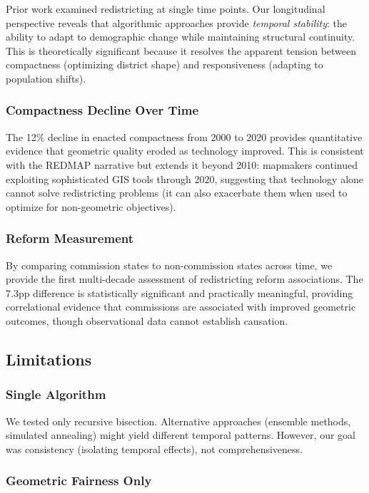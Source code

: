 Prior work examined redistricting at single time points. Our longitudinal perspective reveals that algorithmic approaches provide \textit{temporal stability}: the ability to adapt to demographic change while maintaining structural continuity. This is theoretically significant because it resolves the apparent tension between compactness (optimizing district shape) and responsiveness (adapting to population shifts).

\subsubsection{Compactness Decline Over Time}

The 12\% decline in enacted compactness from 2000 to 2020 provides quantitative evidence that geometric quality eroded as technology improved. This is consistent with the REDMAP narrative but extends it beyond 2010: mapmakers continued exploiting sophisticated GIS tools through 2020, suggesting that technology alone cannot solve redistricting problems (it can also exacerbate them when used to optimize for non-geometric objectives).

\subsubsection{Reform Measurement}

By comparing commission states to non-commission states across time, we provide the first multi-decade assessment of redistricting reform associations. The 7.3pp difference is statistically significant and practically meaningful, providing correlational evidence that commissions are associated with improved geometric outcomes, though observational data cannot establish causation.

\subsection{Limitations}

\subsubsection{Single Algorithm}

We tested only recursive bisection. Alternative approaches (ensemble methods, simulated annealing) might yield different temporal patterns. However, our goal was consistency (isolating temporal effects), not comprehensiveness.

\subsubsection{Geometric Fairness Only}

